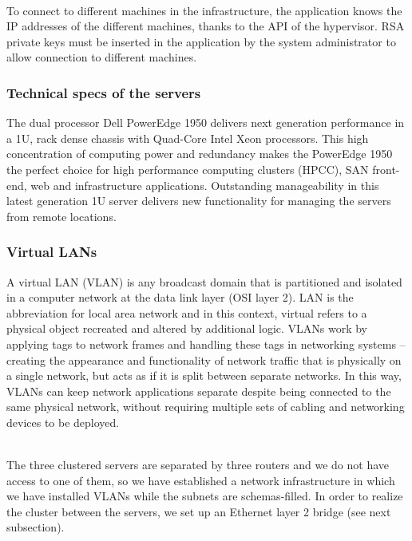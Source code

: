 \\
\vspace{1cm}

To connect to different machines in the infrastructure, the application
knows the IP addresses of the different machines, thanks to the API of
the hypervisor. RSA private keys must be inserted in the application by the system administrator to allow connection to
different machines.

\vspace{1cm}
\subsubsection{Technical specs of the servers}

The dual processor Dell PowerEdge 1950 delivers next generation performance in a 1U, rack dense chassis with Quad-Core Intel Xeon processors. This high concentration of computing power and redundancy makes the PowerEdge 1950 the perfect choice for high performance computing clusters (HPCC), SAN front-end, web and infrastructure applications. Outstanding manageability in this latest generation 1U server delivers new functionality for managing the servers from remote locations.

\pagebreak

\subsubsection{Virtual LANs}

A virtual LAN (VLAN) is any broadcast domain that is partitioned and isolated in a computer network at the data link layer (OSI layer 2). LAN is the abbreviation for local area network and in this context, virtual refers to a physical object recreated and altered by additional logic. VLANs work by applying tags to network frames and handling these tags in networking systems – creating the appearance and functionality of network traffic that is physically on a single network, but acts as if it is split between separate networks. In this way, VLANs can keep network applications separate despite being connected to the same physical network, without requiring multiple sets of cabling and networking devices to be deployed.

\\
\vspace{1cm}
The three clustered servers are separated by three routers and we do not have access to one of them, so we have established a network infrastructure in which we have installed VLANs while the subnets are schemas-filled. In order to realize the cluster between the servers, we set up an Ethernet layer 2 bridge (see next subsection).


